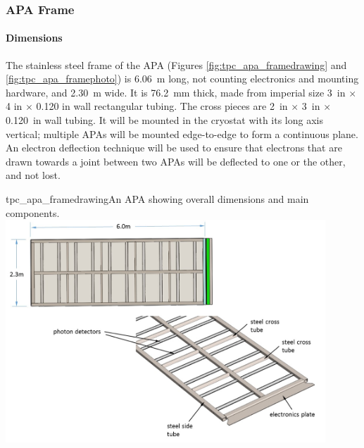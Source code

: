 \subsubsection{APA Frame}


\paragraph{Dimensions}

The stainless steel frame of the APA (Figures \ref{fig:tpc_apa_framedrawing} and \ref{fig:tpc_apa_framephoto}) is 6.06~m long, not counting electronics and mounting hardware, and 2.30~m wide.  It is 76.2~mm thick, made from imperial size 3~in $\times$ 4 in $\times$ 0.120 in wall rectangular tubing.  The cross pieces are 2~in $\times$ 3~in $\times$ 0.120~in wall tubing.  It will be mounted in the cryostat with its long axis vertical; multiple APAs will be mounted edge-to-edge to form a continuous plane. An electron deflection technique will be used to ensure that electrons that are drawn towards a joint between two APAs will be deflected to one or the other, and not lost.

\begin{cdrfigure}{tpc_apa_framedrawing}{An APA showing overall dimensions and main components.}
\includegraphics[width=0.9\textwidth]{figures/tpc_apa_framedrawing.png} 
\end{cdrfigure}

